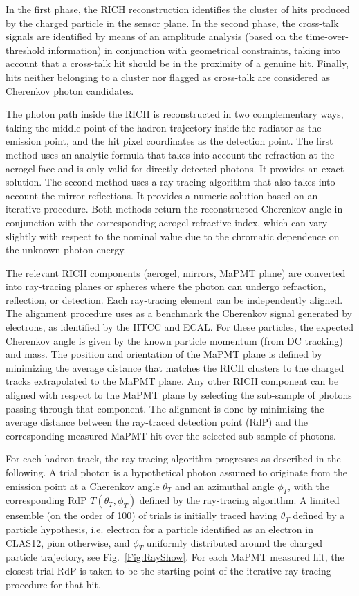 In the first phase, the RICH reconstruction identifies the cluster of hits produced by the charged particle in the
sensor plane. In the second phase, the cross-talk signals are identified by means of an amplitude analysis (based on
the time-over-threshold information) in conjunction with geometrical constraints, taking into account that a cross-talk
hit should be in the proximity of a genuine hit. Finally, hits neither belonging to a cluster nor flagged as cross-talk are
considered as Cherenkov photon candidates. 

The photon path inside the RICH is reconstructed in two complementary ways, taking the middle point of the hadron
trajectory inside the radiator as the emission point, and the hit pixel coordinates as the detection point. The first
method uses an analytic formula that takes into account the refraction at the aerogel face and is only valid for directly
detected photons. It provides an exact solution. The second method uses a ray-tracing algorithm that also takes into
account the mirror reflections. It provides a numeric solution based on an iterative procedure. Both methods return the
reconstructed Cherenkov angle in conjunction with the corresponding aerogel refractive index, which can vary slightly
with respect to the nominal value due to the chromatic dependence on the unknown photon energy.

The relevant RICH components (aerogel, mirrors, MaPMT plane) are converted into ray-tracing planes or spheres
where the photon can undergo refraction, reflection, or detection. Each ray-tracing element can be independently
aligned. The alignment procedure uses as a benchmark the Cherenkov signal generated by electrons, as identified
by the HTCC and ECAL. For these particles, the expected Cherenkov angle is given by the known particle momentum
(from DC tracking) and mass. The position and orientation of the MaPMT plane is defined by minimizing the average
distance that matches the RICH clusters to the charged tracks extrapolated to the MaPMT plane. Any other RICH
component can be aligned with respect to the MaPMT plane by selecting the sub-sample of photons passing through
that component. The alignment is done by minimizing the average distance between the ray-traced detection point
(RdP) and the corresponding measured MaPMT hit over the selected sub-sample of photons.

For each hadron track, the ray-tracing algorithm progresses as described in the following. A trial photon is a
hypothetical photon assumed to originate from the emission point at a Cherenkov angle $\theta_T$ and an azimuthal
angle $\phi_T$, with the corresponding RdP $T(\theta_T, \phi_T)$ defined by the ray-tracing algorithm. A limited
ensemble (on the order of 100) of trials is initially traced having $\theta_T$ defined by a particle hypothesis, i.e.
electron for a particle identified as an electron in CLAS12, pion otherwise, and $\phi_T$ uniformly distributed around
the charged particle trajectory, see Fig.~\ref{Fig:RayShow}. For each MaPMT measured hit, the closest trial RdP is
taken to be the starting point of the iterative ray-tracing procedure for that hit.

